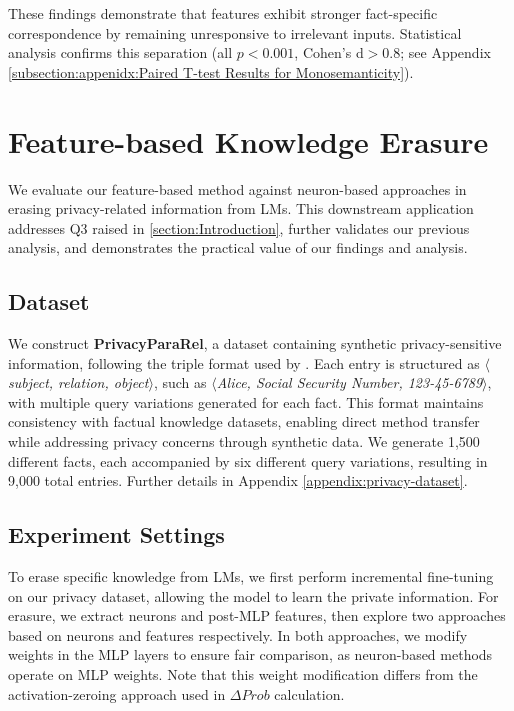 These findings demonstrate that features exhibit stronger fact-specific correspondence by remaining unresponsive to irrelevant inputs. Statistical analysis confirms this separation (all $p < 0.001$, Cohen's d$ > 0.8$; see Appendix \ref{subsection:appenidx:Paired T-test Results for Monosemanticity}).

\section{Feature-based Knowledge Erasure}

\label{section:Privacy Protection}
We evaluate our feature-based method against neuron-based approaches in erasing privacy-related information from LMs. This downstream application addresses Q3 raised in \textsection \ref{section:Introduction}, further validates our previous analysis, and demonstrates the practical value of our findings and analysis.

\subsection{Dataset} 
We construct \textbf{PrivacyParaRel}, a dataset containing synthetic privacy-sensitive information, following the triple format used by \citet{elazar2021measuring-dataset}.  Each entry is structured as \textit{$\langle$subject, relation, object$\rangle$}, such as \textit{$\langle$Alice, Social Security Number, 123-45-6789$\rangle$}, with multiple query variations generated for each fact. This format maintains consistency with factual knowledge datasets, enabling direct method transfer while addressing privacy concerns through synthetic data. We generate 1,500 different facts, each accompanied by six different query variations, resulting in 9,000 total entries. Further details in Appendix \ref{appendix:privacy-dataset}.


\subsection{Experiment Settings}

To erase specific knowledge from LMs, we first perform incremental fine-tuning on our privacy dataset, allowing the model to learn the private information. For erasure, we extract neurons and post-MLP features, then explore two approaches based on neurons and features respectively. In both approaches, we modify weights in the MLP layers to ensure fair comparison, as neuron-based methods operate on MLP weights. Note that this weight modification differs from the activation-zeroing approach used in $\Delta Prob$ calculation.

